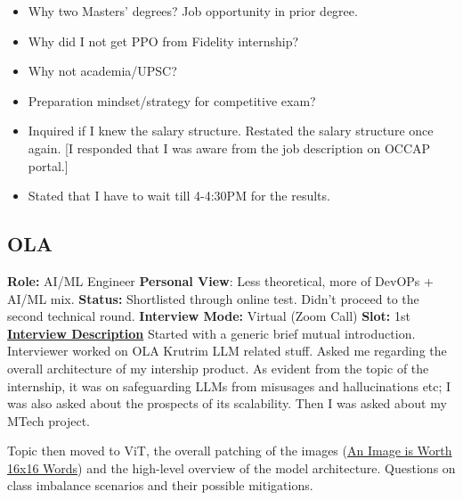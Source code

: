 \documentclass[12pt]{article}
\begin{document}
\begin{itemize}
    \item Why two Masters' degrees? Job opportunity in prior degree.
    \item Why did I not get PPO from Fidelity internship?
    \item Why not academia/UPSC? 
    \item Preparation mindset/strategy for competitive exam?
    \item Inquired if I knew the salary structure. Restated the salary structure once again. [I responded that I was aware from the job description on OCCAP portal.]
    \item Stated that I have to wait till 4-4:30PM for the results.
\end{itemize}







\subsection{OLA}


\textbf{Role:} AI/ML Engineer
\newline
\textbf{Personal View}: Less theoretical, more of DevOPs + AI/ML mix.
\newline
\textbf{Status:} Shortlisted through online test. Didn't proceed to the second technical round.
\newline
\textbf{Interview Mode:} Virtual (Zoom Call)
\newline
\textbf{Slot:} 1st
\vspace{10pt}
\newline
\underline{\textbf{Interview Description}}
\newline
Started with a generic brief mutual introduction. Interviewer worked on OLA Krutrim LLM related stuff. Asked me regarding the overall architecture of my intership product. As evident from the topic of the internship, it was on safeguarding LLMs from misusages and hallucinations etc; I was also asked about the prospects of its scalability. Then I was asked about my MTech project.

Topic then moved to ViT, the overall patching of the images (\href{https://arxiv.org/abs/2010.11929}{An Image is Worth 16x16 Words}) and the high-level overview of the model architecture. Questions on class imbalance scenarios and their possible mitigations. 
\end{document}

